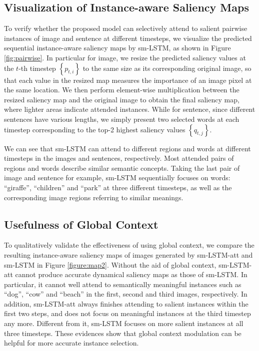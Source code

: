 \documentclass[10pt,twocolumn,letterpaper]{article}
\begin{document}
\subsection{Visualization of Instance-aware Saliency Maps}

To verify whether the proposed model can selectively attend to salient
pairwise instances of image and sentence at different timesteps,
we visualize the predicted sequential instance-aware saliency maps by sm-LSTM,
as shown in Figure \ref{fig:pairwise}.
In particular for image, we resize the predicted saliency values at the $t$-th timestep
${\left\{ {p_{t,i}} \right\}}$ to
the same size as its corresponding original image, so that
each value in the resized map measures the importance of an image pixel at the same location.
We then perform element-wise multiplication between the resized saliency map and the original image
to obtain the final saliency map, where lighter areas indicate attended instances.
While for sentence, since different sentences have various lengths,
we simply present two selected words at each timestep
corresponding to the top-2 highest saliency values ${\left\{ {q_{t,j}} \right\}}$.

We can see that sm-LSTM can attend to different regions and words
at different timesteps in the images and sentences, respectively.
Most attended pairs of regions and words describe similar semantic concepts.
Taking the last pair of image and sentence for example, sm-LSTM sequentially focuses on
words: ``giraffe'', ``children'' and ``park'' at three different timesteps,
as well as the corresponding image regions referring to similar meanings.







\subsection{Usefulness of Global Context} \label{sect:gc}

To qualitatively validate the effectiveness of using global context,
we compare the resulting instance-aware saliency maps of images
generated by sm-LSTM-att and sm-LSTM in Figure \ref{figure:map2}.
Without the aid of global context, sm-LSTM-att cannot produce
accurate dynamical saliency maps as those of sm-LSTM.
In particular, it cannot well attend to semantically meaningful instances
such as ``dog'', ``cow'' and ``beach'' in the first,
second and third images, respectively.
In addition, sm-LSTM-att always finishes attending to salient instances within the first two steps,
and does not focus on meaningful instances at the third timestep any more.
Different from it, sm-LSTM focuses on more salient instances at all three timesteps.
These evidences show that global context modulation
can be helpful for more accurate instance selection.
\end{document}
